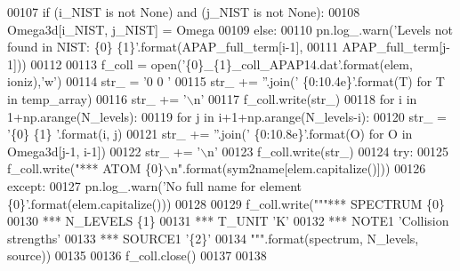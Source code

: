 \begin{DoxyCode}
00107         \textcolor{keywordflow}{if} (i\_NIST \textcolor{keywordflow}{is} \textcolor{keywordflow}{not} \textcolor{keywordtype}{None}) \textcolor{keywordflow}{and} (j\_NIST \textcolor{keywordflow}{is} \textcolor{keywordflow}{not} \textcolor{keywordtype}{None}):
00108             Omega3d[i\_NIST, j\_NIST] = Omega
00109         \textcolor{keywordflow}{else}:
00110             pn.log\_.warn(\textcolor{stringliteral}{'Levels not found in NIST: \{0\} \{1\}'}.format(APAP\_full\_term[i-1], 
00111                                                                     APAP\_full\_term[j-1]))
00112             
00113     f\_coll = open(\textcolor{stringliteral}{'\{0\}\_\{1\}\_coll\_APAP14.dat'}.format(elem, ioniz),\textcolor{stringliteral}{'w'})
00114     str\_ = \textcolor{stringliteral}{'0   0 '}
00115     str\_ += \textcolor{stringliteral}{''}.join(\textcolor{stringliteral}{' \{0:10.4e\}'}.format(T) \textcolor{keywordflow}{for} T \textcolor{keywordflow}{in} temp\_array)
00116     str\_ += \textcolor{stringliteral}{'\(\backslash\)n'}
00117     f\_coll.write(str\_)
00118     \textcolor{keywordflow}{for} i \textcolor{keywordflow}{in} 1+np.arange(N\_levels):
00119         \textcolor{keywordflow}{for} j \textcolor{keywordflow}{in} i+1+np.arange(N\_levels-i):
00120             str\_ = \textcolor{stringliteral}{'\{0\} \{1\} '}.format(i, j)
00121             str\_ += \textcolor{stringliteral}{''}.join(\textcolor{stringliteral}{' \{0:10.8e\}'}.format(O) \textcolor{keywordflow}{for} O \textcolor{keywordflow}{in} Omega3d[j-1, i-1])
00122             str\_ += \textcolor{stringliteral}{'\(\backslash\)n'}
00123             f\_coll.write(str\_)
00124     \textcolor{keywordflow}{try}:
00125         f\_coll.write(\textcolor{stringliteral}{"*** ATOM \{0\}\(\backslash\)n"}.format(sym2name[elem.capitalize()]))
00126     \textcolor{keywordflow}{except}:
00127         pn.log\_.warn(\textcolor{stringliteral}{'No full name for element \{0\}'}.format(elem.capitalize()))
00128 
00129     f\_coll.write(\textcolor{stringliteral}{"""*** SPECTRUM \{0\}}
00130 \textcolor{stringliteral}{*** N\_LEVELS \{1\}}
00131 \textcolor{stringliteral}{*** T\_UNIT 'K'}
00132 \textcolor{stringliteral}{*** NOTE1 'Collision strengths'}
00133 \textcolor{stringliteral}{*** SOURCE1 '\{2\}'}
00134 \textcolor{stringliteral}{"""}.format(spectrum, N\_levels, source))
00135     
00136     f\_coll.close()
00137 
00138 
\end{DoxyCode}
\hypertarget{namespacepyneb_1_1utils_1_1apap_ad78f65e1ca140daa8a34fd88a91db97a}{}
